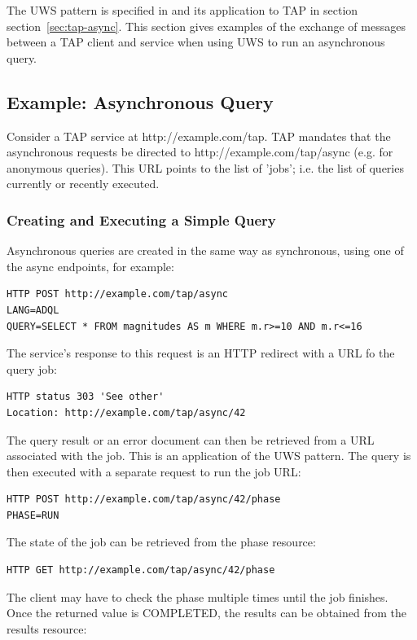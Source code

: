 \documentclass[11pt,letter]{ivoa}
\begin{document}
The UWS pattern is specified in \citep{std:UWS} and its application to TAP in 
section 
section~\ref{sec:tap-async}. This section gives examples of the exchange of messages between a 
TAP client and service when using UWS to run an asynchronous query.

\subsection{Example: Asynchronous Query}
Consider a TAP service at http://example.com/tap. TAP mandates that the 
asynchronous requests be directed to http://example.com/tap/async (e.g. for 
anonymous queries). This URL points to the list of 'jobs'; i.e. the list of 
queries currently or recently executed.

\subsubsection{Creating and Executing a Simple Query}

Asynchronous queries are created in the same way as synchronous, using 
one of the {async} endpoints, for example:

\begin{verbatim}
HTTP POST http://example.com/tap/async
LANG=ADQL
QUERY=SELECT * FROM magnitudes AS m WHERE m.r>=10 AND m.r<=16
\end{verbatim}

The service's response to this request is an HTTP redirect with a URL fo the 
query job:

\begin{verbatim}
HTTP status 303 'See other'
Location: http://example.com/tap/async/42
\end{verbatim}

The query result or an error document can then be retrieved from a URL 
associated with the job. This is an application of the UWS pattern. The query is 
then executed with a separate request to run the job URL:

\begin{verbatim}
HTTP POST http://example.com/tap/async/42/phase
PHASE=RUN
\end{verbatim}

The state of the job can be retrieved from the phase resource:

\begin{verbatim}
HTTP GET http://example.com/tap/async/42/phase
\end{verbatim}

The client may have to check the phase multiple times until the job 
finishes. Once the returned value is COMPLETED, the results can be obtained 
from the results resource:
\end{document}
